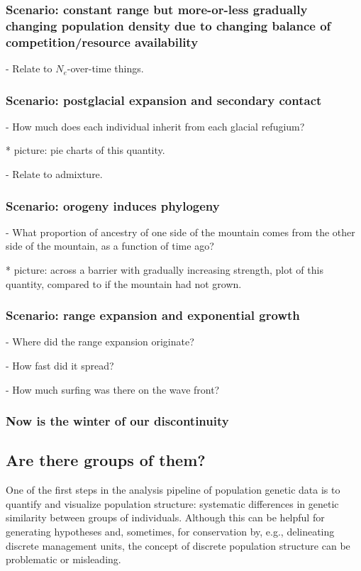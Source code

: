 \documentclass{ar-1col}
\begin{document}
\subsubsection{Scenario: constant range but more-or-less gradually changing population density due to changing balance of competition/resource availability}

        - Relate to $N_e$-over-time things.

\subsubsection{Scenario: postglacial expansion and secondary contact}

        - How much does each individual inherit from each glacial refugium?

            * picture: pie charts of this quantity.

        - Relate to admixture.

\subsubsection{Scenario: orogeny induces phylogeny}

        - What proportion of ancestry of one side of the mountain comes from the other side of the mountain,
            as a function of time ago?

            * picture: across a barrier with gradually increasing strength,
                plot of this quantity, compared to if the mountain had not grown.

\subsubsection{Scenario: range expansion and exponential growth}

        - Where did the range expansion originate?

        - How fast did it spread?

        - How much surfing was there on the wave front?

\subsubsection{Now is the winter of our discontinuity}

\subsection{Are there groups of them?}
One of the first steps in the analysis pipeline of population genetic data
is to quantify and visualize population structure:
systematic differences in genetic similarity between groups of individuals.
Although this can be helpful for generating hypotheses
and, sometimes, for conservation by, e.g., delineating discrete management units,
the concept of discrete population structure
can be problematic or misleading.
\end{document}
